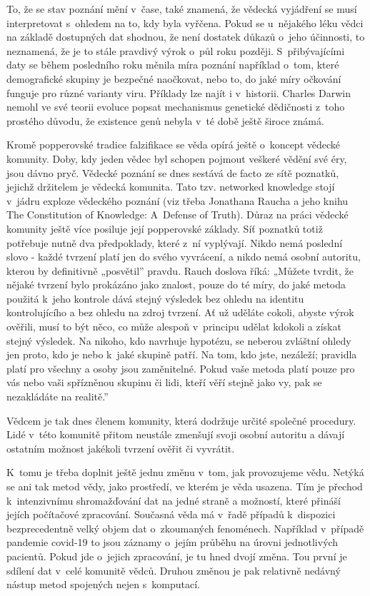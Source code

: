 To, že se stav poznání mění v~čase, také znamená, že vědecká vyjádření se musí interpretovat s~ohledem na to, kdy byla vyřčena. Pokud se u~nějakého léku vědci na základě dostupných dat shodnou, že není dostatek důkazů o~jeho účinnosti, to neznamená, že je to stále pravdivý výrok o~půl roku později. S~přibývajícími daty se během posledního roku měnila míra poznání například o~tom, které demografické skupiny je bezpečné naočkovat, nebo to, do jaké míry očkování funguje pro různé varianty viru. Příklady lze najít i v~historii. Charles Darwin nemohl ve své teorii evoluce popsat mechanismus genetické dědičnosti z~toho prostého důvodu, že existence genů nebyla v~té době ještě široce známá.

Kromě popperovské tradice falzifikace se věda opírá ještě o~koncept vědecké komunity. Doby, kdy jeden vědec byl schopen pojmout veškeré vědění své éry, jsou dávno pryč. Vědecké poznání se dnes sestává de facto ze sítě poznatků, jejichž držitelem je vědecká komunita. Tato tzv. networked knowledge stojí v~jádru exploze vědeckého poznání (viz třeba Jonathana Raucha a jeho knihu The Constitution of Knowledge: A~Defense of Truth). Důraz na práci vědecké komunity ještě více posiluje její popperovské základy. Síť poznatků totiž potřebuje nutně dva předpoklady, které z~ní vyplývají. Nikdo nemá poslední slovo - každé tvrzení platí jen do svého vyvrácení, a nikdo nemá osobní autoritu, kterou by definitivně „posvětil” pravdu. Rauch doslova říká: „Můžete tvrdit, že nějaké tvrzení bylo prokázáno jako znalost, pouze do té míry, do jaké metoda použitá k~jeho kontrole dává stejný výsledek bez ohledu na identitu kontrolujícího a bez ohledu na zdroj tvrzení. Ať už uděláte cokoli, abyste výrok ověřili, musí to být něco, co může alespoň v~principu udělat kdokoli a získat stejný výsledek. Na nikoho, kdo navrhuje hypotézu, se neberou zvláštní ohledy jen proto, kdo je nebo k~jaké skupině patří. Na tom, kdo jste, nezáleží; pravidla platí pro všechny a osoby jsou zaměnitelné. Pokud vaše metoda platí pouze pro vás nebo vaši spřízněnou skupinu či lidi, kteří věří stejně jako vy, pak se nezakládáte na realitě.” \cite{Rauch2021}

Vědcem je tak dnes členem komunity, která dodržuje určité společné procedury. Lidé v~této komunitě přitom neustále zmenšují svoji osobní autoritu a dávají ostatním možnost jakékoli tvrzení ověřit či vyvrátit.

K~tomu je třeba doplnit ještě jednu změnu v~tom, jak provozujeme vědu. Netýká se ani tak metod vědy, jako prostředí, ve kterém je věda usazena. Tím je přechod k~intenzivnímu shromažďování dat na jedné straně a možností, které přináší jejích počítačové zpracování. Současná věda má v~řadě případů k~dispozici bezprecedentně velký objem dat o~zkoumaných fenoménech. Například v~případě pandemie covid-19 to jsou záznamy o~jejím průběhu na úrovni jednotlivých pacientů. Pokud jde o~jejich zpracování, je tu hned dvojí změna. Tou první je sdílení dat v~celé komunitě vědců. Druhou změnou je pak relativně nedávný nástup metod spojených nejen s~komputací.

